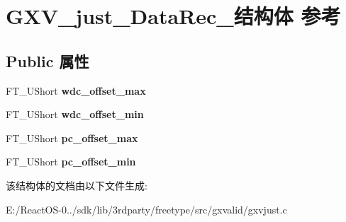 \hypertarget{struct_g_x_v__just___data_rec__}{}\section{G\+X\+V\+\_\+just\+\_\+\+Data\+Rec\+\_\+结构体 参考}
\label{struct_g_x_v__just___data_rec__}
\subsection*{Public 属性}
\begin{DoxyCompactItemize}
\item 
\mbox{\label{struct_g_x_v__just___data_rec___a3bb776ce742cc332e8df6b818ddfd085}} 
F\+T\+\_\+\+U\+Short {\bfseries wdc\+\_\+offset\+\_\+max}
\item 
\mbox{\label{struct_g_x_v__just___data_rec___a03447cf691a111f170baf2e5f911442b}} 
F\+T\+\_\+\+U\+Short {\bfseries wdc\+\_\+offset\+\_\+min}
\item 
\mbox{\label{struct_g_x_v__just___data_rec___a94f5d44d7b645e735b4987047fae52c6}} 
F\+T\+\_\+\+U\+Short {\bfseries pc\+\_\+offset\+\_\+max}
\item 
\mbox{\label{struct_g_x_v__just___data_rec___a9fc2cb8c94ec3ede57cd2bb4c69fb2fd}} 
F\+T\+\_\+\+U\+Short {\bfseries pc\+\_\+offset\+\_\+min}
\end{DoxyCompactItemize}


该结构体的文档由以下文件生成\+:\begin{DoxyCompactItemize}
\item 
E\+:/\+React\+O\+S-\/0../sdk/lib/3rdparty/freetype/src/gxvalid/gxvjust.\+c\end{DoxyCompactItemize}

